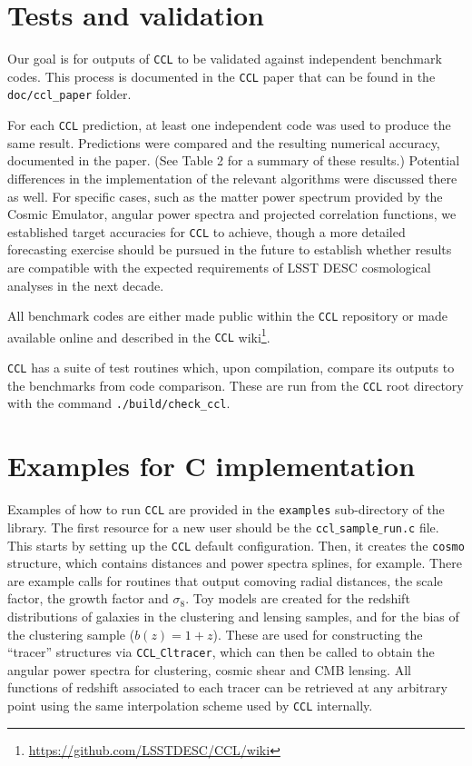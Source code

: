 \documentclass[\docopts]{\docclass}
\newcommand{\ccl}{{\tt CCL}\xspace}
\begin{document}
\section{Tests and validation}
\label{sec:tests}

Our goal is for outputs of \ccl to be validated against independent benchmark codes. This process is documented in the \ccl paper that can be found in the {\tt doc/ccl\_paper} folder.

For each \ccl prediction, at least one independent code was used to produce the same result. Predictions were compared and the resulting numerical accuracy, documented in the paper. (See Table 2 for a summary of these results.) Potential differences in the implementation of the relevant algorithms were discussed there as well. For specific cases, such as the matter power spectrum provided by the Cosmic Emulator, angular power spectra and projected correlation functions, we established target accuracies for \ccl to achieve, though a more detailed forecasting exercise should be pursued in the future to establish whether results are compatible with the expected requirements of LSST DESC cosmological analyses in the next decade.

All benchmark codes are either made public within the \ccl repository or made available online and described in the \ccl wiki\footnote{\url{https://github.com/LSSTDESC/CCL/wiki}}.

\ccl has a suite of test routines which, upon compilation, compare its outputs to the benchmarks from code comparison. These are run from the \ccl root directory with the command {\tt ./build/check\_ccl}.

\section{Examples for C implementation}
\label{sec:example}

Examples of how to run \ccl are provided in the {\tt examples} sub-directory of the library. The first resource for a new user should be the {\tt ccl$\_$sample$\_$run.c} file. This starts by setting up the \ccl default configuration. Then, it creates the {\tt cosmo} structure, which contains distances and power spectra splines, for example. There are example calls for routines that output comoving radial distances, the scale factor, the growth factor and $\sigma_8$. Toy models are created for the redshift distributions of galaxies in the clustering and lensing samples, and for the bias of the clustering sample ($b(z)=1+z$). These are used for constructing the ``tracer'' structures via {\tt CCL$\_$Cltracer}, which can then be called to obtain the angular power spectra for clustering, cosmic shear and CMB lensing. All functions of redshift associated to each tracer can be retrieved at any arbitrary point using the same interpolation scheme used by \ccl internally.
\end{document}
